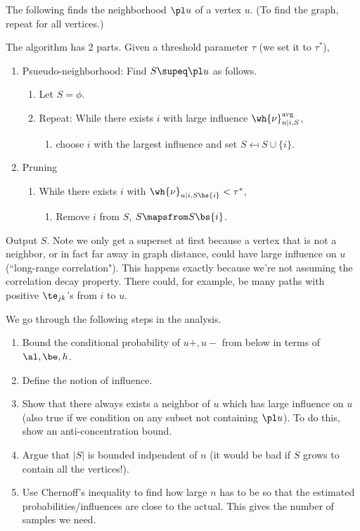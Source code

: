 \begin{alg}
The following finds the neighborhood $\pl u$ of a vertex $u$. (To find the graph, repeat for all vertices.)

The algorithm has 2 parts. Given a threshold parameter $\tau$ (we set it to $\tau^*$),
\begin{enumerate}
\item
Psueudo-neighborhood: Find $S\supeq \pl u$ as follows.
\begin{enumerate}
\item
Let $S=\phi$.
\item Repeat: While there exists $i$ with large influence $\wh{\nu}_{u|i,S}^{\text{avg}}$, 
\begin{enumerate}
\item 
choose $i$ with the largest influence and set $S\mapsfrom S\cup \{i\}$.
\end{enumerate}
\end{enumerate}
\item Pruning
\begin{enumerate}
\item
While there exists $i$ with $\wh{\nu}_{u|i,S\bs \{i\}}<\tau^*$,
\begin{enumerate}
\item
Remove $i$ from $S$, $S\mapsfrom S\bs \{i\}$.
\end{enumerate}
\end{enumerate}
\end{enumerate}
Output $S$. Note we only get a superset at first because a vertex that is not a neighbor, or in fact far away in graph distance, could have large influence on $u$ (``long-range correlation"). This happens exactly because we're not assuming the correlation decay property. There could, for example, be many paths with positive $\te_{jk}$'s from $i$ to $u$.
\end{alg}
We go through the following steps in the analysis.
\begin{enumerate}
\item
Bound the conditional probability of $u+,u-$ from below in terms of $\al,\be,h$.
\item
Define the notion of influence. 
\item 
Show that there always exists a neighbor of $u$ which has large influence on $u$ (also true if we condition on any subset not containing $\pl u$). To do this, show an anti-concentration bound.
\item 
Argue that $|S|$ is bounded indpendent of $n$ (it would be bad if $S$ grows to contain all the vertices!).
\item Use Chernoff's inequality to find how large $n$ has to be so that the estimated probabilities/influences are close to the actual. This gives the number of samples we need.
\end{enumerate}
